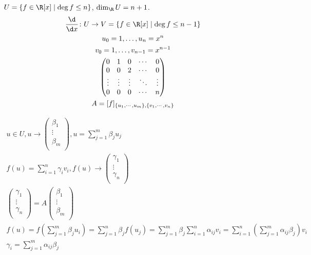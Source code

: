\begin{exmp}
	$U = \{f \in \R[x] \mid \deg f \le n\}$, $\dim_{\R}U = n + 1$.
	\begin{gather*}
		\frac{\d}{\d x}\colon U \to V = \{f \in \R[x] \mid \deg f \le n - 1\} \\
		u_0 = 1, \dots, u_n = x^n \\
		v_0 = 1, \dots, v_{n - 1} = x^{n - 1} \\
		\begin{pmatrix}
			0 & 1 & 0 & \cdots & 0 \\
			0 & 0 & 2 & \cdots & 0 \\
			\vdots&\vdots&\vdots&\ddots&\vdots \\
			0 & 0 & 0 & \cdots & n \\
		\end{pmatrix} \\
		A = [f]_{\{u_1, \cdots, u_m\}, \{v_1, \cdots, v_n\}}
	\end{gather*}
\end{exmp}

\begin{Rem}
	\begin{gather*}
		u \in U, u \to \begin{pmatrix}
			\beta_1 \\
			\vdots \\
			\beta_m \\
		\end{pmatrix}, u = \sum_{j = 1}^m\beta_ju_j \\
		f(u) = \sum_{i = 1}^n\gamma_iv_i, f(u) \to \begin{pmatrix}
			\gamma_1 \\
			\vdots \\
			\gamma_n \\
		\end{pmatrix} \\
		\begin{pmatrix}
			\gamma_1 \\
			\vdots \\
			\gamma_n \\
		\end{pmatrix}
		= A
		\begin{pmatrix}
			\beta_1 \\
			\vdots \\
			\beta_m \\
		\end{pmatrix} \\
		f(u) = f\left(\sum_{j = 1}^m\beta_ju_i\right) = \sum_{j = 1}^n\beta_jf(u_j)
		= \sum_{j = 1}^m\beta_j \sum_{i = 1}^n\alpha_{ij}v_i = \sum_{i = 1}^n\left(\sum_{j = 1}^m\alpha_{ij}\beta_j\right) v_i \\
		\gamma_i = \sum_{j = 1}^m\alpha_{ij}\beta_j 
	\end{gather*}
\end{Rem}

